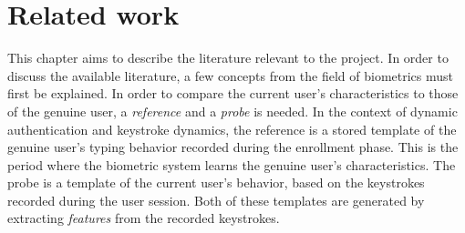 \documentclass[informationsecurity]{gucmasterproject}
\begin{document}
%

\chapter{Related work}
\label{chap:related}
This chapter aims to describe the literature relevant to the project.
In order to discuss the available literature, a few concepts from the field of biometrics must first be explained.
In order to compare the current user's characteristics to those of the genuine user, a \textit{reference} and a \textit{probe} is needed.
In the context of dynamic authentication and keystroke dynamics, the reference is a stored template of the genuine user's typing behavior recorded during the enrollment phase. 
This is the period where the biometric system learns the genuine user's characteristics.
The probe is a template of the current user's behavior, based on the keystrokes recorded during the user session.
Both of these templates are generated by extracting \textit{features} from the recorded keystrokes.
\end{document}
